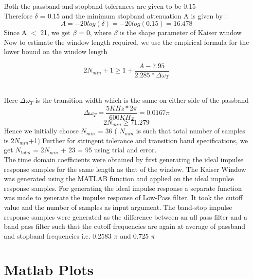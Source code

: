 \documentclass{article}
\begin{document}
Both the passband and stopband tolerances are given to be 0.15\\
Therefore $\delta$ = 0.15 and the minimum stopband attenuation A is given by :
\begin{equation*}
    A = -20log(\delta) = -20log(0.15) = 16.478 
\end{equation*}
Since A $<$ 21, we get $\beta$ = 0, where $\beta$ is the shape parameter of Kaiser window
Now to estimate the window length required, we use the empirical formula for the lower bound on
the window length

\begin{equation*}
    2N_{min} + 1 \geq 1+ \frac{A - 7.95}{2.285*\Delta \omega_T}
\end{equation*}\

Here $\Delta \omega_T$ is the transition width which is the same on either side of the passband
\begin{equation*}
    \Delta \omega_T = \frac{5KHz*2 \pi}{600KHz} = 0.0167 \pi
\end{equation*}
\begin{equation*}
    2N_{min} \geq 71.279 
\end{equation*}
Hence we initially choose $N_{min}$ = 36 ( $N_{min}$ is such that total number of samples is 2$N_{min}$+1) Further for stringent tolerance and transition band specifications, we get $N_{total}$ = 2$N_{min}$ + 23 = 95  using trial and error.\\

The time domain coefficients were obtained by first generating the ideal impulse response samples
for the same length as that of the window. The Kaiser Window was generated using the MATLAB
function and applied on the ideal impulse response samples. For generating the ideal impulse response a separate function was made to generate the impulse response of Low-Pass filter. It took the cutoff value and the number of samples as input argument. The band-stop impulse response samples were generated as the difference between an all pass filter and a band pass filter such that the cutoff frequencies are again at average of passband and stopband frequencies i.e. 0.2583 $\pi$ and 0.725 $\pi$


\section{Matlab Plots}
\end{document}
